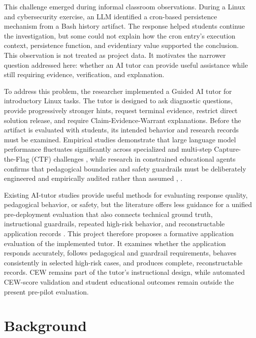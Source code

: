 \documentclass[conference]{IEEEtran}
\begin{document}
This challenge emerged during informal classroom observations. During a
Linux and cybersecurity exercise, an LLM identified a cron-based
persistence mechanism from a Bash history artifact. The response helped
students continue the investigation, but some could not explain how the
cron entry's execution context, persistence function, and evidentiary
value supported the conclusion. This observation is not treated as
project data. It motivates the narrower question addressed here: whether
an AI tutor can provide useful assistance while still requiring
evidence, verification, and explanation.

To address this problem, the researcher implemented a Guided AI tutor
for introductory Linux tasks. The tutor is designed to ask diagnostic
questions, provide progressively stronger hints, request terminal
evidence, restrict direct solution release, and require
Claim-Evidence-Warrant explanations. Before the artifact is evaluated
with students, its intended behavior and research records must be
examined. Empirical studies demonstrate that large language model
performance fluctuates significantly across specialized and multi-step
Capture-the-Flag (CTF) challenges \cite{zou2024leveraging}, while research in constrained
educational agents confirms that pedagogical boundaries and safety
guardrails must be deliberately engineered and empirically audited
rather than assumed \cite{feng2024courseassist,ma2025dbox}, \cite{xiao2025scaffolding}.

Existing AI-tutor studies provide useful methods for evaluating response quality, pedagogical behavior, or safety, but the literature offers less guidance for a unified pre-deployment evaluation that also connects technical ground truth, instructional guardrails, repeated high-risk behavior, and reconstructable application records \cite{maurya2025unifying}. This project therefore proposes a formative application evaluation of the implemented tutor. It examines whether the application responds accurately, follows pedagogical and guardrail requirements, behaves consistently in selected high-risk cases, and produces complete, reconstructable records. CEW remains part of the tutor's instructional
design, while automated CEW-score validation and student educational
outcomes remain outside the present pre-pilot evaluation.

\section{Background}
\end{document}
